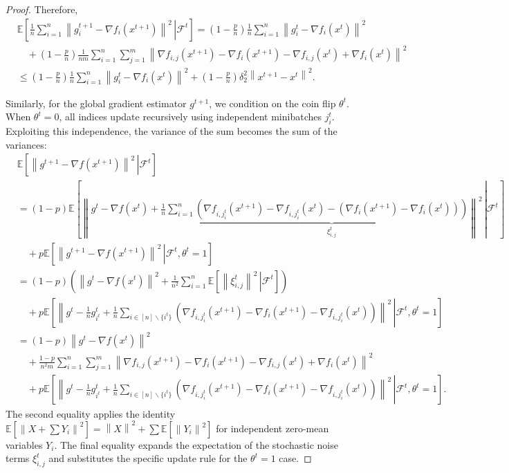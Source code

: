 \documentclass{article}
\newcommand{\bb}{\mathbb}
\newcommand{\sqn}[1]{\left\| #1 \right\|^2}
\newcommand{\Exp}[1]{{\bb E}\left[#1\right]}
\newcommand{\Expb}[2]{\mathbb{E}\!\left[\left. #1\,\right|#2 \right]}
\newcommand{\Expc}[1]{\Expb{#1}{\mathcal{F}^t}}
\theoremstyle{plain}
\begin{document}
\begin{proof}
Therefore,
 \begin{align*}
&\Expc{\frac{1}{n}\sum_{i=1}^n\sqn{g_i^{t+1}-\nabla f_i(x^{t+1})}} = \left(1-\frac{p}{n}\right) \frac{1}{n}\sum_{i=1}^n\sqn{g_i^{t}-\nabla f_i(x^{t})}\\
&\quad+\left(1-\frac{p}{n}\right)\frac{1}{nm}\sum_{i=1}^n\sum_{j=1}^m \sqn{\nabla f_{i,j}(x^{t+1})-\nabla f_i(x^{t+1})-\nabla f_{i,j}(x^{t})+\nabla f_i(x^{t})}\\
&\leq \left(1-\frac{p}{n}\right)\frac{1}{n}\sum_{i=1}^n\sqn{g_i^{t}-\nabla f_i(x^{t})} +\left(1-\frac{p}{n}\right)\delta_2^2\sqn{x^{t+1}-x^t}.
\end{align*}

Similarly, for the global gradient estimator $g^{t+1}$, we condition on the coin flip $\theta^t$. When $\theta^t=0$, all indices update recursively using independent minibatches $j_i^t$. Exploiting this independence, the variance of the sum becomes the sum of the variances:
\begin{align*}
&\Expc{\sqn{g^{t+1}-\nabla f(x^{t+1})}} \\
&= (1-p)\Expb{\left\|g^{t}-\nabla f(x^{t}) + \frac{1}{n}\sum_{i=1}^n \underbrace{\left( \nabla f_{i,j_i^t}(x^{t+1})-\nabla f_{i,j_i^t}(x^{t}) - (\nabla f_i(x^{t+1})-\nabla f_i(x^{t})) \right)}_{\xi_{i,j}^t}\right\|^2}{\mathcal{F}^t} \\
&\quad + p \Expb{\sqn{g^{t+1}-\nabla f(x^{t+1})}}{\mathcal{F}^t,\theta^t=1} \\
&=(1-p)\left(\sqn{g^{t}-\nabla f(x^{t})} + \frac{1}{n^2}\sum_{i=1}^n \Expb{\sqn{\xi_{i,j}^t}}{\mathcal{F}^t}\right) \\
&\quad + p \Expb{\left\|g^{t}-\frac{1}{n}g_{i^t}^t+\frac{1}{n}\sum_{i\in[n]\backslash\{i^t\}}\left(\nabla f_{i,j_i^t}(x^{t+1})-\nabla f_{i}(x^{t+1})-\nabla f_{i,j_i^t}(x^{t})\right)\right\|^2}{\mathcal{F}^t,\theta^t=1} \\
&=(1-p)\sqn{g^{t}-\nabla f(x^{t})} \\
&\quad+\frac{1-p}{n^2 m}\sum_{i=1}^n \sum_{j=1}^m \sqn{\nabla f_{i,j}(x^{t+1})-\nabla f_i(x^{t+1})-\nabla f_{i,j}(x^{t})+\nabla f_i(x^{t})} \\
&\quad + p \Expb{\left\|g^{t}-\frac{1}{n}g_{i^t}^t+\frac{1}{n}\sum_{i\in[n]\backslash\{i^t\}}\left(\nabla f_{i,j_i^t}(x^{t+1})-\nabla f_{i}(x^{t+1})-\nabla f_{i,j_i^t}(x^{t})\right)\right\|^2}{\mathcal{F}^t,\theta^t=1}.
\end{align*}
The second equality applies the identity $\Exp{\sqn{X+\sum Y_i}} = \sqn{X} + \sum \Exp{\sqn{Y_i}}$ for independent zero-mean variables $Y_i$. The final equality expands the expectation of the stochastic noise terms $\xi_{i,j}^t$ and substitutes the specific update rule for the $\theta^t=1$ case.


\end{proof}
\end{document}
